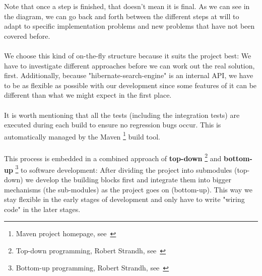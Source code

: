 \noindent
Note that once a step is finished, that doesn't mean it is final. As we can see in the diagram, we can go back and forth between the different steps at will to adapt to specific implementation problems and new problems that have not been covered before.
\\\\
We choose this kind of on-the-fly structure because it suits the project best: We have to investigate different approaches before we can work out the real solution, first. Additionally, because "hibernate-search-engine" is an internal API, we have to be as flexible as possible with our development since some features of it can be different than what we might expect in the first place.
\\\\
It is worth mentioning that all the tests (including the integration tests) are executed during each build to ensure no regression bugs occur. This is automatically managed by the Maven \footnote{Maven project homepage, see~\cite{maven_homepage}} build tool.
\\\\
This process is embedded in a combined approach of \textbf{top-down} \footnote{Top-down programming, Robert Strandh, see~\cite{top_down_strandh}} and \textbf{bottom-up} \footnote{Bottom-up programming, Robert Strandh, see~\cite{bottom_up_strandh}} to software development: After dividing the project into submodules (top-down) we develop the building blocks first and integrate them into bigger mechanisms (the sub-modules) as the project goes on (bottom-up). This way we stay flexible in the early stages of development and only have to write "wiring code" in the later stages.

\pagebreak
